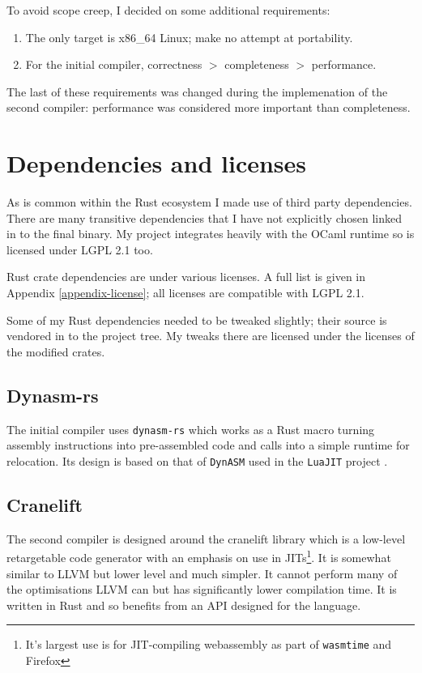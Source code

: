 To avoid scope creep, I decided on some additional requirements:

\begin{enumerate}
    \item The only target is x86\_64 Linux; make no attempt at portability.
    \item For the initial compiler, correctness $>$ completeness $>$ performance.
\end{enumerate}

The last of these requirements was changed during the implemenation of the second compiler:
performance was considered more important than completeness.

\section{Dependencies and licenses}

As is common within the Rust ecosystem I made use of third party dependencies. There are many
transitive dependencies that I have not explicitly chosen linked in to the final binary. My project
integrates heavily with the OCaml runtime so is licensed under LGPL 2.1 too.

Rust crate dependencies are under various licenses. A full list is given in Appendix
\ref{appendix-license}; all licenses are compatible with LGPL 2.1.

Some of my Rust dependencies needed to be tweaked slightly; their source is
vendored in to the project tree. My tweaks there are licensed under the licenses of the modified
crates.

\subsection{Dynasm-rs}

The initial compiler uses \texttt{dynasm-rs} \cite{dynasmrs} which works as a Rust macro turning
assembly instructions into pre-assembled code and calls into a simple runtime for relocation. Its
design is based on that of \texttt{DynASM} used in the \texttt{LuaJIT} project \cite{dynasm}.

\subsection{Cranelift}

The second compiler is designed around the cranelift \cite{cranelift} library which is a
low-level retargetable code generator with an emphasis on use in JITs\footnote{It's largest use is
    for JIT-compiling webassembly as part of \texttt{wasmtime} and Firefox}. It is somewhat similar
to
LLVM but lower level and much simpler. It cannot perform many of the optimisations LLVM can but has
significantly lower compilation time. It is written in Rust and so benefits from an API designed
for the language.


